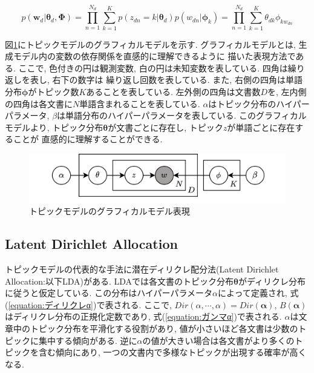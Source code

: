 \documentclass{ltjarticle}
\begin{document}
\begin{equation}
    p(\boldsymbol{w}_d|\boldsymbol{\theta}_d,\boldsymbol{\Phi})=\prod_{n=1}^{N_d}\sum_{k=1}^{K} p(z_{dn}=k|\boldsymbol{\theta}_d)p(w_{dn}|\boldsymbol{\phi}_k)=\prod_{n=1}^{N_d}\sum_{k=1}^{K} \theta_{dk}\phi_{kw_{dn}}
    \label{equation:トピックモデル}
\end{equation}
\vspace{10truept}

図\ref{fig:グラフィカルモデル1}にトピックモデルのグラフィカルモデルを示す. グラフィカルモデルとは, 生成モデル内の変数の依存関係を直感的に理解できるように
描いた表現方法である. ここで, 色付きの円は観測変数, 白の円は未知変数を表している. 四角は繰り返しを表し, 右下の数字は
繰り返し回数を表している. また, 右側の四角は単語分布$\boldsymbol{\phi}$がトピック数$K$あることを表している. 
左外側の四角は文書数$D$を, 左内側の四角は各文書に$N$単語含まれることを表している. 
$\alpha$はトピック分布のハイパーパラメータ, $\beta$は単語分布のハイパーパラメータを表している. 
このグラフィカルモデルより, トピック分布$\boldsymbol{\theta}$が文書ごとに存在し, トピック$z$が単語ごとに存在することが
直感的に理解することができる. 
\begin{figure}[h]
    \centering
    \includegraphics[width = 14.6cm]{images/トピックモデルグラフィカルモデル.drawio.png}
    \caption{トピックモデルのグラフィカルモデル表現}
    \label{fig:グラフィカルモデル1}
\end{figure}


\newpage
\subsection{Latent Dirichlet Allocation}
トピックモデルの代表的な手法に潜在ディリクレ配分法(Latent Dirichlet Allocation:以下LDA)がある. 
LDAでは各文書のトピック分布$\boldsymbol{\theta}$がディリクレ分布に従うと仮定している. 
この分布はハイパーパラメータ$\alpha$によって定義され, 式(\ref{equation:ディリクレα})で表される. 
ここで, $Dir(\alpha, \cdots, \alpha)=Dir(\boldsymbol{\alpha})$, $B(\boldsymbol{\alpha})$
はディリクレ分布の正規化定数であり, 式(\ref{equation:ガンマα})で表される. 
$\alpha$は文章中のトピック分布を平滑化する役割があり, 値が小さいほど各文書は少数のトピックに集中する傾向がある. 
逆に$\alpha$の値が大きい場合は各文書がより多くのトピックを含む傾向にあり, 一つの文書内で多様なトピックが出現する確率が高くなる. 
\vspace{5truept}
\end{document}
